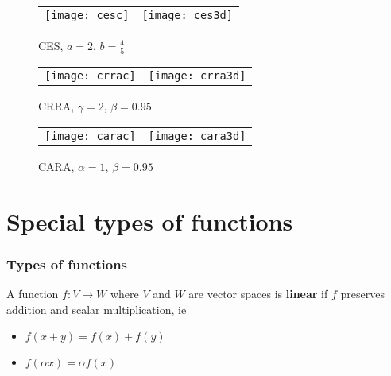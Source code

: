 \documentclass[compress]{beamer}
\renewcommand{\to}{{\rightarrow}}
\begin{document}
\begin{frame}
  \begin{figure}
    \caption{CES, $a = 2$, $b = \frac{4}{5}$}
    \begin{tabular}{cc}
      \texttt{[image: cesc]} &
      \texttt{[image: ces3d]} 
    \end{tabular}
  \end{figure}
\end{frame}

\begin{frame}
  \begin{figure}
    \caption{CRRA, $\gamma = 2$, $\beta = 0.95$}
    \begin{tabular}{cc}
      \texttt{[image: crrac]} &
      \texttt{[image: crra3d]} 
    \end{tabular}
  \end{figure}
\end{frame}

\begin{frame}
  \begin{figure}
    \caption{CARA, $\alpha = 1$, $\beta = 0.95$}
    \begin{tabular}{cc}
      \texttt{[image: carac]} &
      \texttt{[image: cara3d]} 
    \end{tabular}
  \end{figure}
\end{frame}

\section{Special types of functions}

\begin{frame}
  \frametitle{Types of functions}
  \begin{definition}
    A function $f:V \to W$ where $V$ and $W$ are vector spaces is
    \textbf{linear} if $f$ preserves addition and scalar multiplication, ie
    \begin{itemize}
    \item $f(x+y) = f(x) + f(y)$
    \item $f(\alpha x) = \alpha f(x)$
    \end{itemize}
  \end{definition}
\end{frame}
\end{document}
